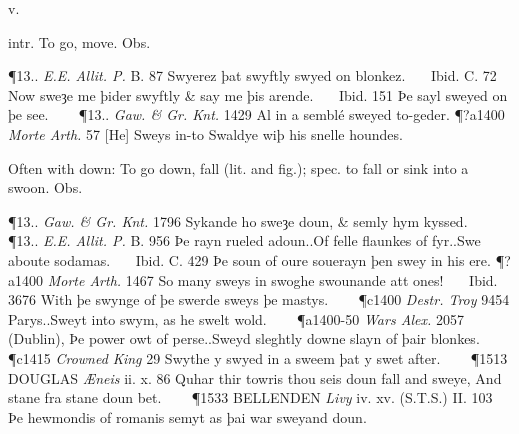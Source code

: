\begin{description}[wide, labelwidth=!, labelindent=0pt]
 v.

\noindent {}

\vspace{-0.3cm}

\begin{myenumerate}

 intr. To go, move. Obs.

\P 13..  \textit{E.E. Allit. P.} B. 87 Swyerez þat swyftly swyed on blonkez.    Ibid. C. 72 Now sweȝe me þider swyftly \& say me þis arende.    Ibid. 151 Þe sayl sweyed on þe see.    
\P 13..  \textit{Gaw. \& Gr. Knt.} 1429 Al in  a semblé sweyed to-geder.
\P ?a1400  \textit{Morte Arth.} 57 [He] Sweys in-to Swaldye wiþ his snelle houndes.

 Often with down: To go down, fall (lit. and fig.); spec. to fall or sink into a swoon. Obs.

\P 13..  \textit{Gaw. \& Gr. Knt.} 1796 Sykande  ho sweȝe doun, \& semly hym kyssed.    
\P 13..  \textit{E.E. Allit. P.} B. 956 Þe rayn rueled adoun..Of felle flaunkes of fyr..Swe aboute sodamas.    Ibid. C. 429 Þe soun of oure souerayn þen swey in his ere.
\P ?a1400  \textit{Morte Arth.} 1467 So many sweys in  swoghe swounande att ones!    Ibid. 3676 With þe swynge of þe swerde sweys þe mastys.    
\P c1400  \textit{Destr. Troy} 9454 Parys..Sweyt into swym, as he swelt wold.    
\P a1400-50  \textit{Wars Alex.} 2057 (Dublin), Þe power owt of perse..Sweyd sleghtly downe slayn of þair blonkes.    
\P c1415 \textit{Crowned  King} 29 Swythe y swyed in a sweem þat y swet after.    
\P 1513 DOUGLAS  \textit{Æneis} ii. x. 86 Quhar thir towris thou seis doun fall and sweye, And stane fra stane doun bet.    
\P 1533 BELLENDEN  \textit{Livy} iv. xv. (S.T.S.) II. 103 Þe hewmondis of romanis semyt as þai war sweyand doun.


\end{myenumerate}
\end{description}
